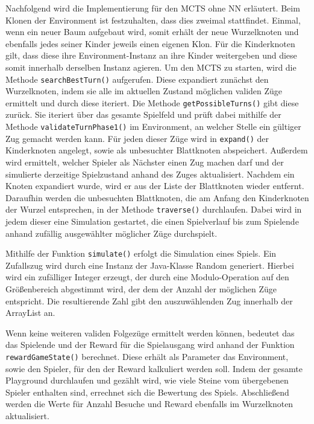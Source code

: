 \documentclass[12pt,a4paper]{article}
\begin{document}
Nachfolgend wird die Implementierung für den MCTS ohne NN erläutert. Beim Klonen der Environment ist festzuhalten, dass dies zweimal stattfindet. Einmal, wenn ein neuer Baum aufgebaut wird, somit erhält der neue Wurzelknoten und ebenfalls jedes seiner Kinder jeweils einen eigenen Klon. Für die Kinderknoten gilt, dass diese ihre Environment-Instanz an ihre Kinder weitergeben und diese somit innerhalb derselben Instanz agieren. Um den MCTS zu starten, wird die Methode \texttt{searchBestTurn()} aufgerufen. Diese expandiert zunächst den Wurzelknoten, indem sie alle im aktuellen Zustand möglichen validen Züge ermittelt und durch diese iteriert. Die Methode \texttt{getPossibleTurns()} gibt diese zurück. Sie iteriert über das gesamte Spielfeld und prüft dabei mithilfe der Methode \texttt{validateTurnPhase1()} im Environment, an welcher Stelle ein gültiger Zug gemacht werden kann. Für jeden dieser Züge wird in \texttt{expand()} der Kinderknoten angelegt, sowie als unbesuchter Blattknoten abspeichert. Außerdem wird ermittelt, welcher Spieler als Nächster einen Zug machen darf und der simulierte derzeitige Spielzustand anhand des Zuges aktualisiert. Nachdem ein Knoten expandiert wurde, wird er aus der Liste der Blattknoten wieder entfernt.
Daraufhin werden die unbesuchten Blattknoten, die am Anfang den Kinderknoten der Wurzel entsprechen, in der Methode \texttt{traverse()} durchlaufen. Dabei wird in jedem dieser eine Simulation gestartet, die einen Spielverlauf bis zum Spielende anhand zufällig ausgewählter möglicher Züge durchspielt. 

Mithilfe der Funktion \texttt{simulate()} erfolgt die Simulation eines Spiels. Ein Zufallszug wird durch eine Instanz der Java-Klasse Random generiert. Hierbei wird ein zufälliger Integer erzeugt, der durch eine Modulo-Operation auf den Größenbereich abgestimmt wird, der dem der Anzahl der möglichen Züge entspricht. Die resultierende Zahl gibt den auszuwählenden Zug innerhalb der ArrayList an.

Wenn keine weiteren validen Folgezüge ermittelt werden können, bedeutet das das Spielende und der Reward für die Spielausgang wird anhand der Funktion \texttt{rewardGameState()} berechnet. Diese erhält als Parameter das Environment, sowie den Spieler, für den der Reward kalkuliert werden soll. Indem der gesamte Playground durchlaufen und gezählt wird, wie viele Steine vom übergebenen Spieler enthalten sind, errechnet sich die Bewertung des Spiels. Abschließend werden die Werte für Anzahl Besuche und Reward ebenfalls im Wurzelknoten aktualisiert.
\end{document}
